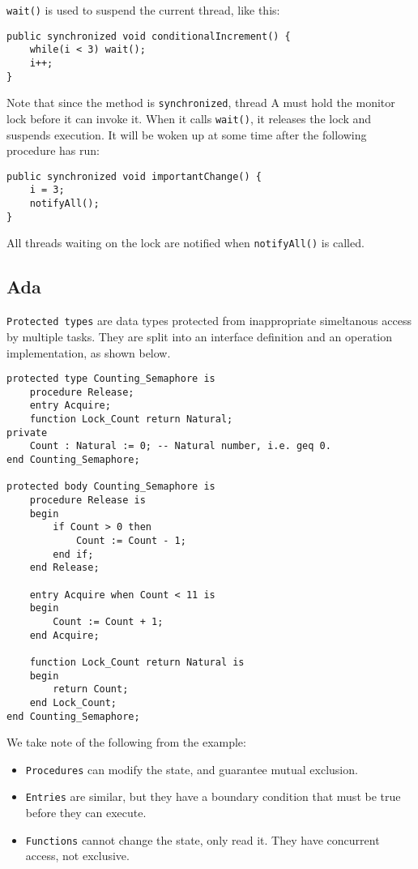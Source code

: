 \texttt{wait()} is used to suspend the current thread, like this:
\begin{verbatim}
public synchronized void conditionalIncrement() {
    while(i < 3) wait();
    i++;
}
\end{verbatim}
Note that since the method is \texttt{synchronized}, thread A must hold the monitor lock before it can invoke it. When it calls \texttt{wait()}, it releases the lock and suspends execution. It will be woken up at some time after the following procedure has run:
\begin{verbatim}
public synchronized void importantChange() {
    i = 3;
    notifyAll();
}
\end{verbatim} 
All threads waiting on the lock are notified when \texttt{notifyAll()} is called.

\subsection{Ada}
\texttt{Protected types} are data types protected from inappropriate simeltanous access by multiple tasks. They are split into an interface definition and an operation implementation, as shown below.
\begin{verbatim}
protected type Counting_Semaphore is
    procedure Release;
    entry Acquire;
    function Lock_Count return Natural;
private 
    Count : Natural := 0; -- Natural number, i.e. geq 0.
end Counting_Semaphore;

protected body Counting_Semaphore is 
    procedure Release is
    begin
        if Count > 0 then
            Count := Count - 1;
        end if;
    end Release;

    entry Acquire when Count < 11 is
    begin   
        Count := Count + 1;
    end Acquire;

    function Lock_Count return Natural is 
    begin
        return Count;
    end Lock_Count;
end Counting_Semaphore;
\end{verbatim}
We take note of the following from the example:
\begin{itemize}
    \item \texttt{Procedures} can modify the state, and guarantee mutual exclusion. 
    \item \texttt{Entries} are similar, but they have a boundary condition that must be true before they can execute. 
    \item \texttt{Functions} cannot change the state, only read it. They have concurrent access, not exclusive.
\end{itemize}
